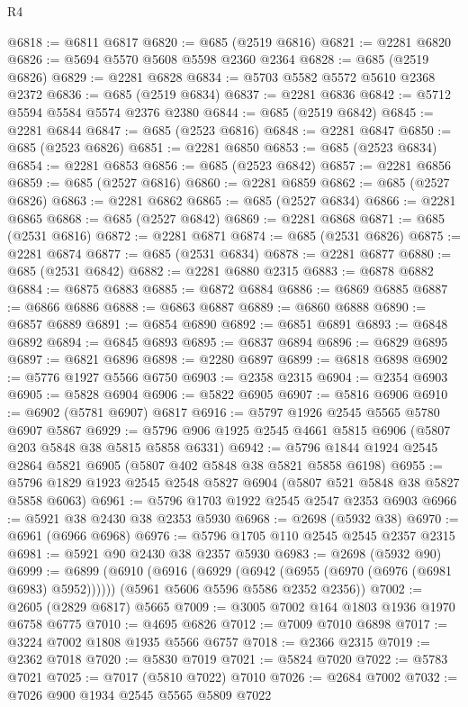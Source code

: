 \begin{lexlean}{R4}
\begin{coremodule}
@6818 := @6811 @6817
@6820 := @685 (@2519 @6816)
@6821 := @2281 @6820
@6826 := @5694 @5570 @5608 @5598 @2360 @2364
@6828 := @685 (@2519 @6826)
@6829 := @2281 @6828
@6834 := @5703 @5582 @5572 @5610 @2368 @2372
@6836 := @685 (@2519 @6834)
@6837 := @2281 @6836
@6842 := @5712 @5594 @5584 @5574 @2376 @2380
@6844 := @685 (@2519 @6842)
@6845 := @2281 @6844
@6847 := @685 (@2523 @6816)
@6848 := @2281 @6847
@6850 := @685 (@2523 @6826)
@6851 := @2281 @6850
@6853 := @685 (@2523 @6834)
@6854 := @2281 @6853
@6856 := @685 (@2523 @6842)
@6857 := @2281 @6856
@6859 := @685 (@2527 @6816)
@6860 := @2281 @6859
@6862 := @685 (@2527 @6826)
@6863 := @2281 @6862
@6865 := @685 (@2527 @6834)
@6866 := @2281 @6865
@6868 := @685 (@2527 @6842)
@6869 := @2281 @6868
@6871 := @685 (@2531 @6816)
@6872 := @2281 @6871
@6874 := @685 (@2531 @6826)
@6875 := @2281 @6874
@6877 := @685 (@2531 @6834)
@6878 := @2281 @6877
@6880 := @685 (@2531 @6842)
@6882 := @2281 @6880 @2315
@6883 := @6878 @6882
@6884 := @6875 @6883
@6885 := @6872 @6884
@6886 := @6869 @6885
@6887 := @6866 @6886
@6888 := @6863 @6887
@6889 := @6860 @6888
@6890 := @6857 @6889
@6891 := @6854 @6890
@6892 := @6851 @6891
@6893 := @6848 @6892
@6894 := @6845 @6893
@6895 := @6837 @6894
@6896 := @6829 @6895
@6897 := @6821 @6896
@6898 := @2280 @6897
@6899 := @6818 @6898
@6902 := @5776 @1927 @5566 @6750
@6903 := @2358 @2315
@6904 := @2354 @6903
@6905 := @5828 @6904
@6906 := @5822 @6905
@6907 := @5816 @6906
@6910 := @6902 (@5781 @6907) @6817
@6916 := @5797 @1926 @2545 @5565 @5780 @6907 @5867
@6929 := @5796 @906 @1925 @2545 @4661 @5815 @6906 (@5807 @203 @5848 @38 @5815 @5858 @6331)
@6942 := @5796 @1844 @1924 @2545 @2864 @5821 @6905 (@5807 @402 @5848 @38 @5821 @5858 @6198)
@6955 := @5796 @1829 @1923 @2545 @2548 @5827 @6904 (@5807 @521 @5848 @38 @5827 @5858 @6063)
@6961 := @5796 @1703 @1922 @2545 @2547 @2353 @6903
@6966 := @5921 @38 @2430 @38 @2353 @5930
@6968 := @2698 (@5932 @38)
@6970 := @6961 (@6966 @6968)
@6976 := @5796 @1705 @110 @2545 @2545 @2357 @2315
@6981 := @5921 @90 @2430 @38 @2357 @5930
@6983 := @2698 (@5932 @90)
@6999 := @6899
    (@6910
      (@6916 (@6929 (@6942 (@6955 (@6970 (@6976 (@6981 @6983) @5952))))))
      (@5961 @5606 @5596 @5586 @2352 @2356))
@7002 := @2605 (@2829 @6817) @5665
@7009 := @3005 @7002 @164 @1803 @1936 @1970 @6758 @6775
@7010 := @4695 @6826
@7012 := @7009 @7010 @6898
@7017 := @3224 @7002 @1808 @1935 @5566 @6757
@7018 := @2366 @2315
@7019 := @2362 @7018
@7020 := @5830 @7019
@7021 := @5824 @7020
@7022 := @5783 @7021
@7025 := @7017 (@5810 @7022) @7010
@7026 := @2684 @7002
@7032 := @7026 @900 @1934 @2545 @5565 @5809 @7022

\end{coremodule}
\end{lexlean}

